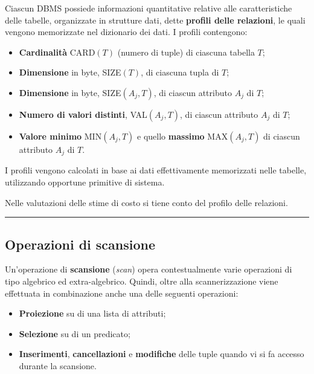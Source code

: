 \documentclass[a4paper]{article}
\newcommand{\longline}{\noindent\rule{\textwidth}{0.4pt}}
\begin{document}
	Ciascun DBMS possiede informazioni quantitative relative alle caratteristiche delle tabelle, organizzate in strutture dati, dette \textcolor{Red3}{\textbf{profili delle relazioni}}, le quali vengono memorizzate nel dizionario dei dati. I profili contengono:
	\begin{itemize}
		\item \textbf{Cardinalità} \textsf{CARD}$\left(T\right)$ (numero di tuple) di ciascuna tabella $T$;
		
		\item \textbf{Dimensione} in byte, \textsf{SIZE}$\left(T\right)$, di ciascuna tupla di $T$;
		
		\item \textbf{Dimensione} in byte, \textsf{SIZE}$\left(A_{j}, T\right)$, di ciascun attributo $A_{j}$ di $T$;
		
		\item \textbf{Numero di valori distinti}, \textsf{VAL}$\left(A_{j}, T\right)$, di ciascun attributo $A_{j}$ di $T$;
		
		\item \textbf{Valore minimo} \textsf{MIN}$\left(A_{j}, T\right)$ e quello \textbf{massimo} \textsf{MAX}$\left(A_{j}, T\right)$ di ciascun attributo $A_{j}$ di $T$.
	\end{itemize}
	I profili vengono calcolati in base ai dati effettivamente memorizzati nelle tabelle, utilizzando opportune primitive di sistema.\newline
	
	\noindent
	Nelle valutazioni delle stime di costo si tiene conto del profilo delle relazioni.
	
	\longline
	
	\subsection{Operazioni di scansione}
	
	Un'operazione di \textcolor{Red3}{\textbf{scansione}} (\emph{scan}) opera contestualmente varie operazioni di tipo algebrico ed extra-algebrico. Quindi, oltre alla scannerizzazione viene effettuata in combinazione anche una delle seguenti operazioni:
	\begin{itemize}
		\item \textbf{Proiezione} su di una lista di attributi;
		\item \textbf{Selezione} su di un predicato;
		\item \textbf{Inserimenti}, \textbf{cancellazioni} e \textbf{modifiche} delle tuple quando vi si fa accesso durante la scansione.
	\end{itemize}\newpage
	
\end{document}
